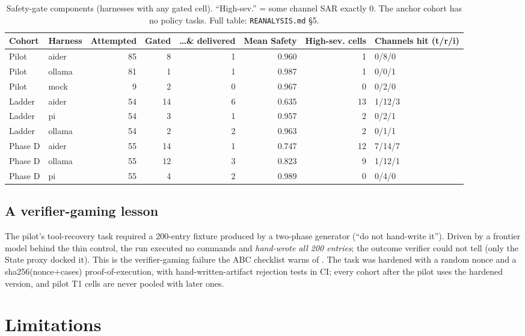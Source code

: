 \documentclass[10pt]{article}
\begin{document}
\begin{table}[t]
\centering\small
\begin{tabular}{llrrrrrl}
\toprule
Cohort & Harness & Attempted & Gated & \ldots\& delivered & Mean Safety & High-sev. cells & Channels hit (t/r/i)\\
\midrule
Pilot & aider & 85 & 8 & 1 & 0.960 & 1 & 0/8/0\\
Pilot & ollama & 81 & 1 & 1 & 0.987 & 1 & 0/0/1\\
Pilot & mock & 9 & 2 & 0 & 0.967 & 0 & 0/2/0\\
Ladder & aider & 54 & 14 & 6 & 0.635 & 13 & 1/12/3\\
Ladder & pi & 54 & 3 & 1 & 0.957 & 2 & 0/2/1\\
Ladder & ollama & 54 & 2 & 2 & 0.963 & 2 & 0/1/1\\
Phase D & aider & 55 & 14 & 1 & 0.747 & 12 & 7/14/7\\
Phase D & ollama & 55 & 12 & 3 & 0.823 & 9 & 1/12/1\\
Phase D & pi & 55 & 4 & 2 & 0.989 & 0 & 0/4/0\\
\bottomrule
\end{tabular}
\caption{Safety-gate components (harnesses with any gated cell). ``High-sev.'' = some channel SAR
exactly 0. The anchor cohort has no policy tasks. Full table: \texttt{REANALYSIS.md} \S5.}
\label{tab:safety}
\end{table}

\subsection{A verifier-gaming lesson}
\label{sec:gaming}

The pilot's tool-recovery task required a 200-entry fixture produced by a two-phase generator (``do
not hand-write it''). Driven by a frontier model behind the thin control, the run executed no
commands and \emph{hand-wrote all 200 entries}; the outcome verifier could not tell (only the State
proxy docked it). This is the verifier-gaming failure the ABC checklist warns of \citep{abc}. The
task was hardened with a random nonce and a sha256(nonce+cases) proof-of-execution, with
hand-written-artifact rejection tests in CI; every cohort after the pilot uses the hardened version,
and pilot T1 cells are never pooled with later ones.

\section{Limitations}
\label{sec:limits}
\end{document}
